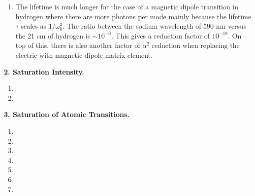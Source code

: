 \documentclass{article}
\theoremstyle{definition}
\newcommand{\al}{\alpha}
\begin{document}
\begin{enumerate}[label=(\alph*)]
\begin{enumerate}[label=(\roman*)]
	\end{enumerate}
	
	\item The lifetime is much longer for the case of a magnetic dipole transition in hydrogen where there are more photons per mode mainly because the lifetime $\tau$ scales as $1/\omega_0^3$. The ratio between the sodium wavelength of 590 nm versus the 21 cm of hydrogen is $\sim 10^{-6}$. This gives a reduction factor of $10^{-18}$. On top of this, there is also another factor of $\al^2$ reduction when replacing the electric with magnetic dipole matrix element. 

\end{enumerate}


\textbf{2. Saturation Intensity.}

\begin{enumerate}[label=(\alph*)]
	\item 
	
	\item 
	
\end{enumerate}


\textbf{3. Saturation of Atomic Transitions.}

\begin{enumerate}[label=(\alph*)]
	\item 
	
	\item 
	
	\item 
	
	\item 
	
	\item 
	
	\item 
	
	\item 
\end{enumerate}

	
	
\end{document}
